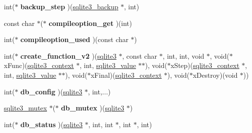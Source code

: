 \begin{DoxyCompactItemize}
\item 
\hypertarget{structsqlite3__api__routines_a3a8f0bc14589950ee606d5354ff364ed}{int($\ast$ {\bfseries backup\-\_\-step} )(\hyperlink{structsqlite3__backup}{sqlite3\-\_\-backup} $\ast$, int)}\label{structsqlite3__api__routines_a3a8f0bc14589950ee606d5354ff364ed}

\item 
\hypertarget{structsqlite3__api__routines_a1d94408829d5cc628c2947f321367e80}{const char $\ast$($\ast$ {\bfseries compileoption\-\_\-get} )(int)}\label{structsqlite3__api__routines_a1d94408829d5cc628c2947f321367e80}

\item 
\hypertarget{structsqlite3__api__routines_a788dd672feeff349c417beff9a7eb26c}{int($\ast$ {\bfseries compileoption\-\_\-used} )(const char $\ast$)}\label{structsqlite3__api__routines_a788dd672feeff349c417beff9a7eb26c}

\item 
\hypertarget{structsqlite3__api__routines_ae2cd022f6c2bb188773ef656d79d26f1}{int($\ast$ {\bfseries create\-\_\-function\-\_\-v2} )(\hyperlink{structsqlite3}{sqlite3} $\ast$, const char $\ast$, int, int, void $\ast$, void($\ast$x\-Func)(\hyperlink{structsqlite3__context}{sqlite3\-\_\-context} $\ast$, int, \hyperlink{struct_mem}{sqlite3\-\_\-value} $\ast$$\ast$), void($\ast$x\-Step)(\hyperlink{structsqlite3__context}{sqlite3\-\_\-context} $\ast$, int, \hyperlink{struct_mem}{sqlite3\-\_\-value} $\ast$$\ast$), void($\ast$x\-Final)(\hyperlink{structsqlite3__context}{sqlite3\-\_\-context} $\ast$), void($\ast$x\-Destroy)(void $\ast$))}\label{structsqlite3__api__routines_ae2cd022f6c2bb188773ef656d79d26f1}

\item 
\hypertarget{structsqlite3__api__routines_a60ceed179513c5ac09b0ed39c725dbf6}{int($\ast$ {\bfseries db\-\_\-config} )(\hyperlink{structsqlite3}{sqlite3} $\ast$, int,...)}\label{structsqlite3__api__routines_a60ceed179513c5ac09b0ed39c725dbf6}

\item 
\hypertarget{structsqlite3__api__routines_a3b6e71fa5b3a8b01af308189d68a6f88}{\hyperlink{structsqlite3__mutex}{sqlite3\-\_\-mutex} $\ast$($\ast$ {\bfseries db\-\_\-mutex} )(\hyperlink{structsqlite3}{sqlite3} $\ast$)}\label{structsqlite3__api__routines_a3b6e71fa5b3a8b01af308189d68a6f88}

\item 
\hypertarget{structsqlite3__api__routines_ac3ea73ff30ee0c21446f94a643581280}{int($\ast$ {\bfseries db\-\_\-status} )(\hyperlink{structsqlite3}{sqlite3} $\ast$, int, int $\ast$, int $\ast$, int)}\label{structsqlite3__api__routines_ac3ea73ff30ee0c21446f94a643581280}


\end{DoxyCompactItemize}
